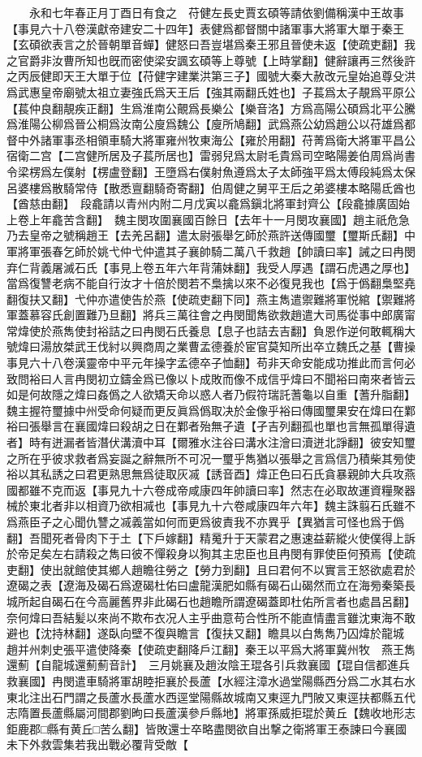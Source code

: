 　　永和七年春正月丁酉日有食之　苻健左長史賈玄碩等請依劉備稱漢中王故事【事見六十八卷漢獻帝建安二十四年】表健爲都督關中諸軍事大將軍大單于秦王【玄碩欲表言之於晉朝單音蟬】健怒曰吾豈堪爲秦王邪且晉使未返【使疏吏翻】我之官爵非汝曹所知也旣而密使梁安諷玄碩等上尊號【上時掌翻】健辭讓再三然後許之丙辰健即天王大單于位【苻健字建業洪第三子】國號大秦大赦改元皇始追尊殳洪爲武惠皇帝廟號太祖立妻強氏爲天王后【強其兩翻氏姓也】子萇爲太子靚爲平原公【萇仲良翻靚疾正翻】生爲淮南公覿爲長樂公【樂音洛】方爲高陽公碩爲北平公騰爲淮陽公柳爲晉公桐爲汝南公廋爲魏公【廋所鳩翻】武爲燕公幼爲趙公以苻雄爲都督中外諸軍事丞相領車騎大將軍雍州牧東海公【雍於用翻】苻菁爲衛大將軍平昌公宿衛二宫【二宫健所居及子萇所居也】雷弱兒爲太尉毛貴爲司空略陽姜伯周爲尚書令梁楞爲左僕射【楞盧登翻】王墮爲右僕射魚遵爲太子太師強平爲太傅段純爲太保呂婆樓爲散騎常侍【散悉亶翻騎奇寄翻】伯周健之舅平王后之弟婆樓本略陽氐酋也【酋慈由翻】　段龕請以青州内附二月戊寅以龕爲鎭北將軍封齊公【段龕據廣固始上卷上年龕苦含翻】　魏主閔攻圍襄國百餘日【去年十一月閔攻襄國】趙主祇危急乃去皇帝之號稱趙王【去羌呂翻】遣太尉張舉乞師於燕許送傳國璽【璽斯氏翻】中軍將軍張春乞師於姚弋仲弋仲遣其子襄帥騎二萬八千救趙【帥讀曰率】誡之曰冉閔弃仁背義屠滅石氏【事見上卷五年六年背蒲妹翻】我受人厚遇【謂石虎遇之厚也】當爲復讐老病不能自行汝才十倍於閔若不梟擒以來不必復見我也【爲于僞翻梟堅堯翻復扶又翻】弋仲亦遣使告於燕【使疏吏翻下同】燕主雋遣禦難將軍悦綰【禦難將軍蓋慕容氏創置難乃旦翻】將兵三萬往會之冉閔聞雋欲救趙遣大司馬從事中郎廣甯常煒使於燕雋使封裕詰之曰冉閔石氏養息【息子也詰去吉翻】負恩作逆何敢輒稱大號煒曰湯放桀武王伐紂以興商周之業曹孟德養於宦官莫知所出卒立魏氏之基【曹操事見六十八卷漢靈帝中平元年操字孟德卒子恤翻】苟非天命安能成功推此而言何必致問裕曰人言冉閔初立鑄金爲已像以卜成敗而像不成信乎煒曰不聞裕曰南來者皆云如是何故隱之煒曰姦僞之人欲矯天命以惑人者乃假符瑞託蓍龜以自重【蓍升脂翻】魏主握符璽據中州受命何疑而更反眞爲僞取决於金像乎裕曰傳國璽果安在煒曰在鄴裕曰張舉言在襄國煒曰殺胡之日在鄴者殆無孑遺【孑吉列翻孤也單也言無孤單得遺者】時有迸漏者皆潛伏溝瀆中耳【爾雅水注谷曰溝水注澮曰瀆迸北諍翻】彼安知璽之所在乎彼求救者爲妄誕之辭無所不可况一璽乎雋猶以張舉之言爲信乃積柴其㫄使裕以其私誘之曰君更熟思無爲徒取灰㓕【誘音酉】煒正色曰石氏貪暴親帥大兵攻燕國都雖不克而返【事見九十六卷成帝咸康四年帥讀曰率】然志在必取故運資糧聚器械於東北者非以相資乃欲相㓕也【事見九十六卷咸康四年六年】魏主誅翦石氏雖不爲燕臣子之心聞仇讐之㓕義當如何而更爲彼責我不亦異乎【異猶言可怪也爲于僞翻】吾聞死者骨肉下于土【下戶嫁翻】精䰟升于天蒙君之惠速益薪縱火使僕得上訴於帝足矣左右請殺之雋曰彼不憚殺身以狥其主忠臣也且冉閔有罪使臣何預焉【使疏吏翻】使出就館使其鄉人趙瞻往勞之【勞力到翻】且曰君何不以實言王怒欲處君於遼碣之表【遼海及碣石爲遼碣杜佑曰盧龍漢肥如縣有碣石山碣然而立在海㫄秦築長城所起自碣石在今高麗舊界非此碣石也趙瞻所謂遼碣蓋即杜佑所言者也處昌呂翻】奈何煒曰吾結髪以來尚不欺布衣况人主乎曲意苟合性所不能直情盡言雖沈東海不敢避也【沈持林翻】遂臥向壁不復與瞻言【復扶又翻】瞻具以白雋雋乃囚煒於龍城　趙并州刺史張平遣使降秦【使疏吏翻降戶江翻】秦王以平爲大將軍冀州牧　燕王雋還薊【自龍城還薊薊音計】　三月姚襄及趙汝陰王琨各引兵救襄國【琨自信都進兵救襄國】冉閔遣車騎將軍胡睦拒襄於長蘆【水經注漳水過堂陽縣西分爲二水其右水東北注出石門謂之長蘆水長蘆水西逕堂陽縣故城南又東逕九門陂又東逕扶都縣五代志隋置長蘆縣屬河間郡劉昫曰長蘆漢參戶縣地】將軍孫威拒琨於黄丘【魏收地形志鉅鹿郡□縣有黄丘□苦么翻】皆敗還士卒略盡閔欲自出撃之衛將軍王泰諫曰今襄國未下外救雲集若我出戰必覆背受敵【